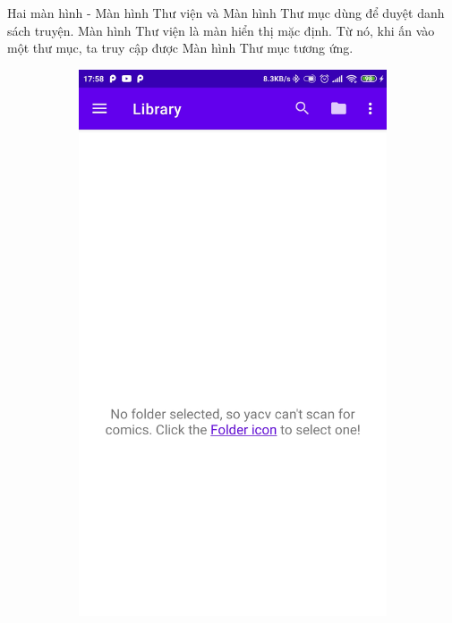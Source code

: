\documentclass[../../thesis]{subfiles}
\begin{document}
Hai màn hình - Màn hình Thư viện và Màn hình Thư mục dùng để duyệt danh sách
truyện. Màn hình Thư viện là màn hiển thị mặc định. Từ nó, khi ấn vào một thư
mục, ta truy cập được Màn hình Thư mục tương ứng.

\begin{figure}[H]
    \centering
    \begin{subfigure}[b]{0.328\textwidth}
        \centering
        \includegraphics[scale=0.12]{../images/Screenshot_2021-05-27-17-58-36-567_com.uet.nvmnghia.yacv}

\end{subfigure}
\end{figure}
\end{document}
